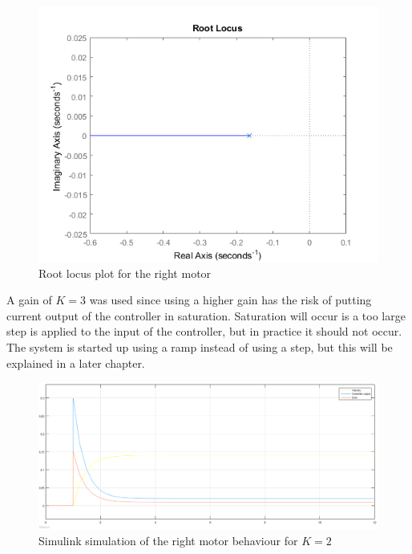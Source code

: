 \begin{figure}[htbp]
\centering
\includegraphics[width = \textwidth]{pics/RM_rlocus.png}
\caption{Root locus plot for the right motor}
\label{fig:RM_rlocus}
\end{figure}



A gain of $K = 3$ was used since using a higher gain has the risk of putting current output of the controller in saturation. Saturation will occur is a too large step is applied to the input of the controller, but in practice it should not occur. The system is started up using a ramp instead of using a step, but this will be explained in a later chapter.

\begin{figure}[htbp]
\centering
\includegraphics[width = \textwidth]{pics/RM_K2_SIM.png}
\caption{Simulink simulation of the right motor behaviour for $K = 2$}
\label{fig:RM_K2_SIM}
\end{figure}

